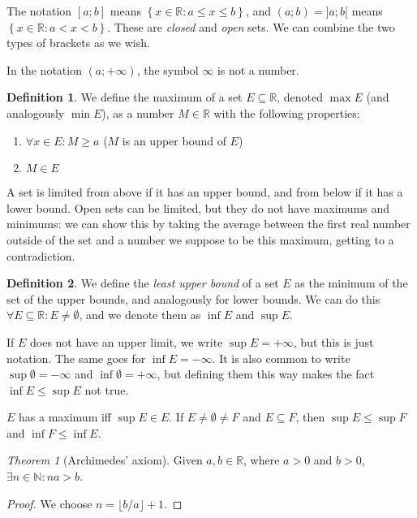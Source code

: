 \documentclass[12pt,a4paper]{report}
\numberwithin{equation}{section}
\theoremstyle{definition}
\newtheorem{definition}{Definition}[section]
\theoremstyle{remark}
\newtheorem{theorem}{Theorem}[section]
\begin{document}
The notation $[a; b]$ means $\left\lbrace x \in \mathbb{R}: a \leq x \leq b\right\rbrace$, and $(a; b) = ]a;b[$ means $\left\lbrace x \in \mathbb{R}: a < x < b\right\rbrace$. These are \emph{closed} and \emph{open} sets. We can combine the two types of brackets as we wish.

In the notation $(a; + \infty )$, the symbol $\infty$ is not a number.

\begin{definition}
We define the maximum of a set $E\subseteq \mathbb{R}$, denoted $\max E$ (and analogously $\min E$), as a number $M \in \mathbb{R}$ with the following properties:
\begin{enumerate}
\item $\forall x \in E: M \geq a$ ($M$ is an upper bound of $E$)
\item $M \in E$
\end{enumerate}
\end{definition}

A set is limited from above if it has an upper bound, and from below if it has a lower bound.
Open sets can be limited, but they do not have maximums and minimums: we can show this by taking the average between the first real number outside of the set and a number we suppose to be this maximum, getting to a contradiction.

\begin{definition}
We define the \emph{least upper bound} of a set $E$ as the minimum of the set of the upper bounds, and analogously for lower bounds. We can do this $\forall E \subseteq \mathbb{R}: E \neq \emptyset$, and we denote them as $\inf E$ and $\sup E$.
\end{definition}

If $E$ does not have an upper limit, we write $\sup E = + \infty$, but this is just notation. The same goes for $\inf E = -\infty$. It is also common to write $\sup \emptyset = - \infty$ and $\inf \emptyset = + \infty$, but defining them this way makes the fact $\inf E \leq \sup E$ not true.

$E$ has a maximum iff $\sup E \in E$. If $E \neq \emptyset \neq F$ and $E \subseteq F$, then $\sup E \leq \sup F$ and $\inf F \leq \inf E$.

\begin{theorem}[Archimedes' axiom]
Given $a, b \in \mathbb{R}$, where $a>0$ and $b>0$, $\exists n\in\mathbb{N}: na>b$.
\end{theorem}

\begin{proof}
We choose $n = \lfloor b/a \rfloor +1$.
\end{proof}
\end{document}
